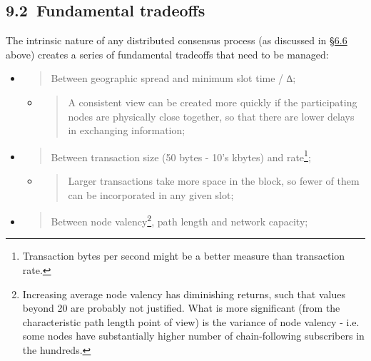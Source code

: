\documentclass[11pt,a4paper]{article}
\begin{document}
\hypertarget{fundamental-tradeoffs}{%
\subsection{​9.2​~Fundamental tradeoffs}\label{fundamental-tradeoffs}}

The intrinsic nature of any distributed consensus process (as discussed
in \protect\hyperlink{decentralisation-constraints}{{§6.6}} above)
creates a series of fundamental tradeoffs that need to be managed:

\begin{itemize}
\item
  \begin{quote}
  Between geographic spread and minimum slot time / ∆;
  \end{quote}

  \begin{itemize}
  \item
    \begin{quote}
    A consistent view can be created more quickly if the participating
    nodes are physically close together, so that there are lower delays
    in exchanging information;
    \end{quote}
  \end{itemize}
\item
  \begin{quote}
  Between transaction size (50 bytes - 10's kbytes) and rate\footnote{Transaction
    bytes per second might be a better measure than transaction rate.};
  \end{quote}

  \begin{itemize}
  \item
    \begin{quote}
    Larger transactions take more space in the block, so fewer of them
    can be incorporated in any given slot;
    \end{quote}
  \end{itemize}
\item
  \begin{quote}
  Between node valency\footnote{Increasing average node valency has
    diminishing returns, such that values beyond 20 are probably not
    justified. What is more significant (from the characteristic path
    length point of view) is the variance of node valency - i.e. some
    nodes have substantially higher number of chain-following
    subscribers in the hundreds.}, path length and network capacity;
  \end{quote}


\end{itemize}
\end{document}
